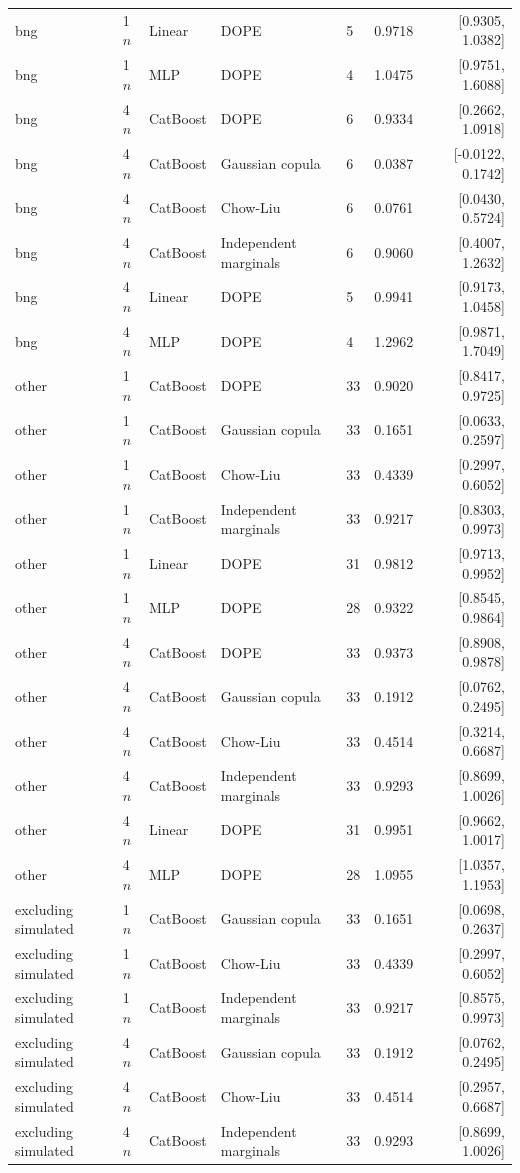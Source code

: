 \begin{longtable}{lllllrr}
bng & 1$n$ & Linear & DOPE & 5 & 0.9718 & [0.9305, 1.0382] \\
bng & 1$n$ & MLP & DOPE & 4 & 1.0475 & [0.9751, 1.6088] \\
bng & 4$n$ & CatBoost & DOPE & 6 & 0.9334 & [0.2662, 1.0918] \\
bng & 4$n$ & CatBoost & Gaussian copula & 6 & 0.0387 & [-0.0122, 0.1742] \\
bng & 4$n$ & CatBoost & Chow-Liu & 6 & 0.0761 & [0.0430, 0.5724] \\
bng & 4$n$ & CatBoost & Independent marginals & 6 & 0.9060 & [0.4007, 1.2632] \\
bng & 4$n$ & Linear & DOPE & 5 & 0.9941 & [0.9173, 1.0458] \\
bng & 4$n$ & MLP & DOPE & 4 & 1.2962 & [0.9871, 1.7049] \\
other & 1$n$ & CatBoost & DOPE & 33 & 0.9020 & [0.8417, 0.9725] \\
other & 1$n$ & CatBoost & Gaussian copula & 33 & 0.1651 & [0.0633, 0.2597] \\
other & 1$n$ & CatBoost & Chow-Liu & 33 & 0.4339 & [0.2997, 0.6052] \\
other & 1$n$ & CatBoost & Independent marginals & 33 & 0.9217 & [0.8303, 0.9973] \\
other & 1$n$ & Linear & DOPE & 31 & 0.9812 & [0.9713, 0.9952] \\
other & 1$n$ & MLP & DOPE & 28 & 0.9322 & [0.8545, 0.9864] \\
other & 4$n$ & CatBoost & DOPE & 33 & 0.9373 & [0.8908, 0.9878] \\
other & 4$n$ & CatBoost & Gaussian copula & 33 & 0.1912 & [0.0762, 0.2495] \\
other & 4$n$ & CatBoost & Chow-Liu & 33 & 0.4514 & [0.3214, 0.6687] \\
other & 4$n$ & CatBoost & Independent marginals & 33 & 0.9293 & [0.8699, 1.0026] \\
other & 4$n$ & Linear & DOPE & 31 & 0.9951 & [0.9662, 1.0017] \\
other & 4$n$ & MLP & DOPE & 28 & 1.0955 & [1.0357, 1.1953] \\
excluding simulated & 1$n$ & CatBoost & Gaussian copula & 33 & 0.1651 & [0.0698, 0.2637] \\
excluding simulated & 1$n$ & CatBoost & Chow-Liu & 33 & 0.4339 & [0.2997, 0.6052] \\
excluding simulated & 1$n$ & CatBoost & Independent marginals & 33 & 0.9217 & [0.8575, 0.9973] \\
excluding simulated & 4$n$ & CatBoost & Gaussian copula & 33 & 0.1912 & [0.0762, 0.2495] \\
excluding simulated & 4$n$ & CatBoost & Chow-Liu & 33 & 0.4514 & [0.2957, 0.6687] \\
excluding simulated & 4$n$ & CatBoost & Independent marginals & 33 & 0.9293 & [0.8699, 1.0026] \\
\bottomrule
\end{longtable}
